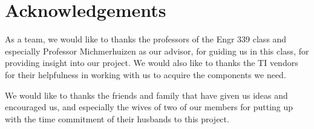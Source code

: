 \documentclass[ppfs.tex]{template/subfiles}
\begin{document}
\section{Acknowledgements}

As a team, we would like to thanks the professors of the Engr 339 class and especially Professor Michmerhuizen as our advisor, for guiding us in this class, for providing insight into our project. We would also like to thanks the TI vendors for their helpfulness in working with us to acquire the components we need.

We would like to thanks the friends and family that have given us ideas and encouraged us, and especially the wives of two of our members for putting up with the time commitment of their husbands to this project.
\end{document}
